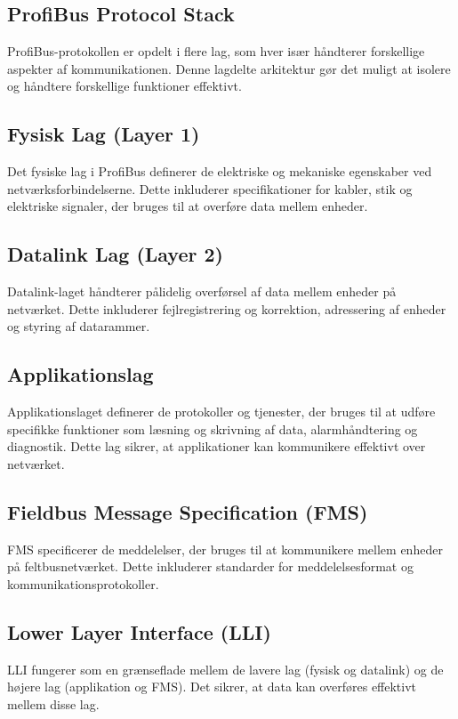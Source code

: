 \subsection{ProfiBus Protocol Stack}
ProfiBus-protokollen er opdelt i flere lag, som hver især håndterer forskellige aspekter af kommunikationen. Denne lagdelte arkitektur gør det muligt at isolere og håndtere forskellige funktioner effektivt.

\subsection*{Fysisk Lag (Layer 1)}
Det fysiske lag i ProfiBus definerer de elektriske og mekaniske egenskaber ved netværksforbindelserne. Dette inkluderer specifikationer for kabler, stik og elektriske signaler, der bruges til at overføre data mellem enheder.

\subsection*{Datalink Lag (Layer 2)}
Datalink-laget håndterer pålidelig overførsel af data mellem enheder på netværket. Dette inkluderer fejlregistrering og korrektion, adressering af enheder og styring af datarammer.

\subsection*{Applikationslag}
Applikationslaget definerer de protokoller og tjenester, der bruges til at udføre specifikke funktioner som læsning og skrivning af data, alarmhåndtering og diagnostik. Dette lag sikrer, at applikationer kan kommunikere effektivt over netværket.

\subsection*{Fieldbus Message Specification (FMS)}
FMS specificerer de meddelelser, der bruges til at kommunikere mellem enheder på feltbusnetværket. Dette inkluderer standarder for meddelelsesformat og kommunikationsprotokoller.

\subsection*{Lower Layer Interface (LLI)}
LLI fungerer som en grænseflade mellem de lavere lag (fysisk og datalink) og de højere lag (applikation og FMS). Det sikrer, at data kan overføres effektivt mellem disse lag.

